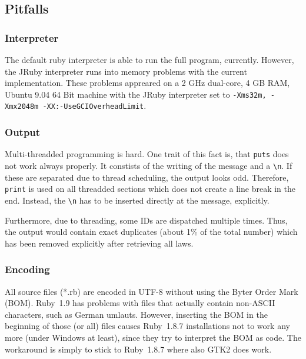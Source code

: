 \documentclass{scrartcl}
\begin{document}
\subsection{Pitfalls}
\subsubsection{Interpreter}
The default ruby interpreter is able to run the full program, currently. However, the JRuby interpreter runs into memory problems with the current implementation. These problems appreared on a 2 GHz dual-core, 4 GB RAM, Ubuntu 9.04 64 Bit machine with the JRuby interpreter set to \texttt{-Xms32m, -Xmx2048m -XX:-UseGCIOverheadLimit}.

\subsubsection{Output}
\label{output-pitfalls}
Multi-threadded programming is hard. One trait of this fact is, that \texttt{puts} does not work always properly. It constists of the writing of the message and a \texttt{\textbackslash n}. If these are separated due to thread scheduling, the output looks odd. Therefore, \texttt{print} is used on all threadded sections which does not create a line break in the end. Instead, the \texttt{\textbackslash n} has to be inserted directly at the message, explicitly.

Furthermore, due to threading, some IDs are dispatched multiple times. Thus, the output would contain exact duplicates (about 1\% of the total number) which has been removed explicitly after retrieving all laws.

\subsubsection{Encoding}
All source files (*.rb) are encoded in UTF-8 without using the Byter Order Mark (BOM). Ruby~1.9 has problems with files that actually contain non-ASCII characters, such as German umlauts. However, inserting the BOM in the beginning of those (or all) files causes Ruby~1.8.7 installations not to work any more (under Windows at least), since they try to interpret the BOM as code. The workaround is simply to stick to Ruby~1.8.7 where also GTK2 does work.
\end{document}
